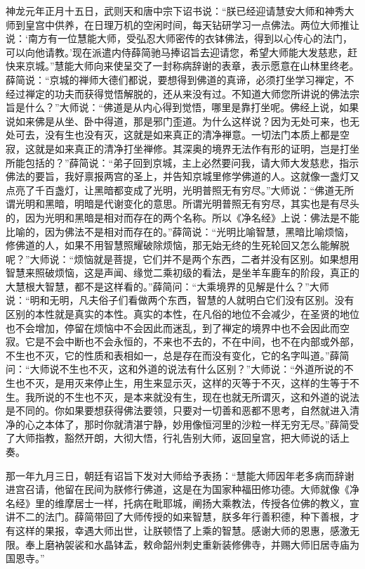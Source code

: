 \documentclass[12pt,twoside,openany]{book}
\newcommand{\kai}[1]{{\CJKfamily{kai}#1}}
\begin{document}
\kai{神龙元年正月十五日，武则天和唐中宗下诏书说：“朕已经迎请慧安大师和神秀大师到皇宫中供养，在日理万机的空闲时间，每天钻研学习一点佛法。两位大师推让说：‘南方有一位慧能大师，受弘忍大师密传的衣钵佛法，得到以心传心的法门，可以向他请教。’现在派遣内侍薛简驰马捧诏旨去迎请您，希望大师能大发慈悲，赶快来京城。”慧能大师向来使呈交了一封称病辞谢的表章，表示愿意在山林里终老。薛简说：“京城的禅师大德们都说，要想得到佛道的真谛，必须打坐学习禅定，不经过禅定的功夫而获得觉悟解脱的，还从来没有过。不知道大师您所讲说的佛法宗旨是什么？”大师说：“佛道是从内心得到觉悟，哪里是靠打坐呢。佛经上说，如果说如来佛是从坐、卧中得道，那是邪门歪道。为什么这样说？因为无处可来，也无处可去，没有生也没有灭，这就是如来真正的清净禅意。一切法门本质上都是空寂，这就是如来真正的清净打坐禅修。其深奥的境界无法作有形的证明，岂是打坐所能包括的？”薛简说：“弟子回到京城，主上必然要问我，请大师大发慈悲，指示佛法的要旨，我好禀报两宫的圣上，并告知京城里修学佛道的人。这就像一盏灯又点亮了千百盏灯，让黑暗都变成了光明，光明普照无有穷尽。”大师说：“佛道无所谓光明和黑暗，明暗是代谢变化的意思。所谓光明普照无有穷尽，其实也是有尽头的，因为光明和黑暗是相对而存在的两个名称。所以《净名经》上说：佛法是不能比喻的，因为佛法不是相对而存在的。”薛简说：“光明比喻智慧，黑暗比喻烦恼，修佛道的人，如果不用智慧照耀破除烦恼，那无始无终的生死轮回又怎么能解脱呢？”大师说：“烦恼就是菩提，它们并不是两个东西，二者并没有区别。如果想用智慧来照破烦恼，这是声闻、缘觉二乘初级的看法，是坐羊车鹿车的阶段，真正的大慧根大智慧，都不是这样看的。”薛简问：“大乘境界的见解是什么？”大师说：“明和无明，凡夫俗子们看做两个东西，智慧的人就明白它们没有区别。没有区别的本性就是真实的本性。真实的本性，在凡俗的地位不会减少，在圣贤的地位也不会增加，停留在烦恼中不会因此而迷乱，到了禅定的境界中也不会因此而空寂。它是不会中断也不会永恒的，不来也不去的，不在中间，也不在内部或外部，不生也不灭，它的性质和表相如一，总是存在而没有变化，它的名字叫道。”薛简问：“大师说不生也不灭，这和外道的说法有什么区别？”大师说：“外道所说的不生也不灭，是用灭来停止生，用生来显示灭，这样的灭等于不灭，这样的生等于不生。我所说的不生也不灭，是本来就没有生，现在也就无所谓灭，这和外道的说法是不同的。你如果要想获得佛法要领，只要对一切善和恶都不思考，自然就进入清净的心之本体了，那时你就清湛宁静，妙用像恒河里的沙粒一样无穷无尽。”薛简受了大师指教，豁然开朗，大彻大悟，行礼告别大师，返回皇宫，把大师说的话上奏。
	
那一年九月三日，朝廷有诏旨下发对大师给予表扬：“慧能大师因年老多病而辞谢进宫召请，他留在民间为朕修行佛道，这是在为国家种福田修功德。大师就像《净名经》里的维摩居士一样，托病在毗耶城，阐扬大乘教法，传授各位佛的教义，宣讲不二的法门。薛简带回了大师传授的如来智慧，朕多年行善积德，种下善根，才有这样的果报，幸遇大师出世，让朕顿悟了上乘的智慧。感谢大师的恩惠，感激无限。奉上磨衲袈裟和水晶钵盂，敕命韶州刺史重新装修佛寺，并赐大师旧居寺庙为国恩寺。”}
\end{document}

